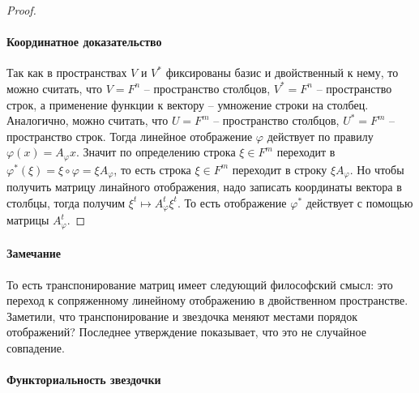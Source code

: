 \begin{proof}
\paragraph{Координатное доказательство}

Так как в пространствах $V$ и $V^*$ фиксированы базис и двойственный к нему, то можно считать, что $V = F^n$ -- пространство столбцов, $V^* = F^n$ -- пространство строк, а применение функции к вектору -- умножение строки на столбец.
Аналогично, можно считать, что $U = F^m$ -- пространство столбцов, $U^*=F^m$ -- пространство строк.
Тогда линейное отображение $\varphi$ действует по правилу $\varphi(x) = A_{\varphi} x$.
Значит по определению строка $\xi \in F^m$ переходит в $\varphi^*(\xi) = \xi \circ \varphi = \xi A_{\varphi}$, то есть строка $\xi\in F^m$ переходит в строку $\xi A_{\varphi}$.
Но чтобы получить матрицу линайного отображения, надо записать координаты вектора в столбцы, тогда получим $\xi^t \mapsto A_{\varphi}^t \xi^t$.
То есть отображение $\varphi^*$ действует с помощью матрицы $A_{\varphi}^t$.
\end{proof}

\paragraph{Замечание}

То есть транспонирование матриц имеет следующий философский смысл: это переход к сопряженному линейному отображению в двойственном пространстве.
Заметили, что транспонирование и звездочка меняют местами порядок отображений?
Последнее утверждение показывает, что это не случайное совпадение.

\paragraph{Функториальность звездочки}

